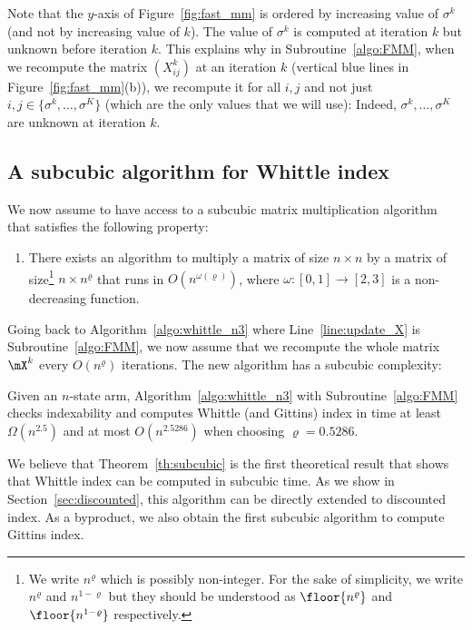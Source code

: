 Note that the $y$-axis of Figure~\ref{fig:fast_mm} is ordered by increasing value of $\sigma^k$ (and not by increasing value of $k$). The value of $\sigma^k$ is computed at iteration $k$ but unknown before iteration $k$. This explains why in Subroutine~\ref{algo:FMM}, when we recompute the matrix $(X^{k}_{ij})$ at an iteration $k$ (vertical blue lines in Figure~\ref{fig:fast_mm}(b)), we recompute it for all $i,j$ and not just $i,j\in\{\sigma^{k}, \dots, \sigma^K\}$ (which are the only values that we will use): Indeed, $\sigma^{k}, \dots, \sigma^K$ are unknown at iteration $k$. 

\subsection{A subcubic algorithm for Whittle index}

We now assume to have access to a subcubic matrix multiplication algorithm that satisfies the following property:
\begin{enumerate}[label=(FMM)]    
    \item \label{hypo:FMM} There exists an algorithm to multiply a matrix of size $n\times n$ by a matrix of size\footnote{We write $n^\varrho$ which is possibly non-integer. For the sake of simplicity, we write $n^\varrho$ and $n^{1-\varrho}$ but they should be understood as $\floor{n^\varrho}$ and $\floor{n^{1-\varrho}}$ respectively.} $n\times  n^\varrho $ that runs in $O(n^{\omega(\varrho)})$, where $\omega:[0,1]\to[2,3]$ is a non-decreasing function.
\end{enumerate}

Going back to Algorithm~\ref{algo:whittle_n3} where Line~\ref{line:update_X} is Subroutine~\ref{algo:FMM}, we now assume that we recompute the whole matrix $\mX^k$ every $O(n^\varrho)$ iterations. The new algorithm has a subcubic complexity:

\begin{thm}
    \label{th:subcubic}
    Given an $n$-state arm, Algorithm~\ref{algo:whittle_n3} with Subroutine~\ref{algo:FMM} checks indexability and computes Whittle (and Gittins) index in time at least $\Omega(n^{2.5})$ and at most $O(n^{2.5286})$ when choosing $\varrho=0.5286$.
\end{thm}

We believe that Theorem~\ref{th:subcubic} is the first theoretical result that shows that Whittle index can be computed in subcubic time. As we show in Section~\ref{sec:discounted}, this algorithm can be directly extended to discounted index. As a byproduct, we also obtain the first subcubic algorithm to compute Gittins index.


